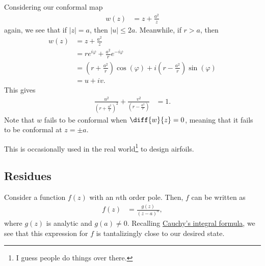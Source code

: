 \documentclass[10pt]{mypackage}
\begin{document}
\begin{example}
  Considering our conformal map
  \begin{align*}
    w(z) &= z + \frac{a^2}{z}
  \end{align*}
  again, we see that if $\left\vert z \right\vert = a$, then $\left\vert u \right\vert \leq 2a$. Meanwhile, if $r > a$, then
  \begin{align*}
    w\left( z \right) &= z + \frac{a^2}{z}\\
                      &= re^{i\varphi} + \frac{a^2}{r}e^{-i\varphi}\\
                      &= \left( r + \frac{a^2}{r} \right)\cos\left( \varphi \right) + i\left( r - \frac{a^2}{r} \right)\sin\left( \varphi \right)\\
                      &= u + iv.
  \end{align*}
  This gives
  \begin{align*}
    \frac{u^2}{\left( r+ \frac{a^2}{r} \right)^2} + \frac{v^2}{\left( r-\frac{a^2}{r} \right)} &= 1.
  \end{align*}
  Note that $w$ fails to be conformal when $\diff{w}{z} = 0$, meaning that it fails to be conformal at $z = \pm a$.\newline

  This is occasionally used in the real world\footnote{I guess people do things over there.} to design airfoils.
\end{example}
\subsection{Residues}%
Consider a function $f(z)$ with an $n$th order pole. Then, $f$ can be written as
\begin{align*}
  f(z) &= \frac{g(z)}{\left( z-a \right)^n},
\end{align*}
where $g(z)$ is analytic and $g(a)\neq 0$. Recalling \hyperref[thm:cauchy_integral_formula]{Cauchy's integral formula}, we see that this expression for $f$ is tantalizingly close to our desired state.\newline
\end{document}
